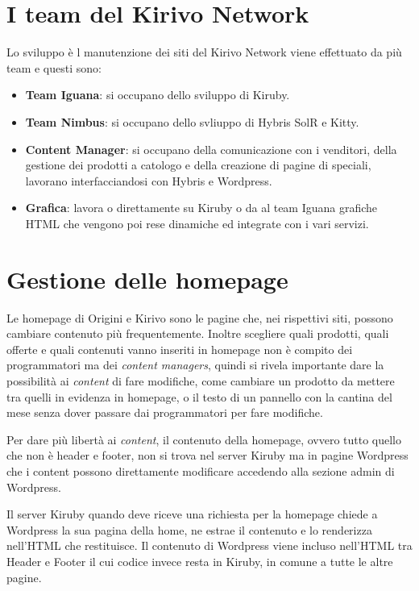 
\section{I team del Kirivo Network}
Lo sviluppo è l manutenzione dei siti del Kirivo Network viene effettuato da più team e questi sono:
\begin{itemize}
\item {\bf Team Iguana}: si occupano dello sviluppo di Kiruby.
\item {\bf Team Nimbus}: si occupano dello svliuppo di Hybris SolR e Kitty.
\item {\bf Content Manager}: si occupano della comunicazione con i venditori, della gestione dei prodotti a catologo
 e della creazione di pagine di speciali, lavorano interfacciandosi con Hybris e Wordpress.
\item {\bf Grafica}: lavora o direttamente su Kiruby o da al team Iguana grafiche HTML che vengono poi rese dinamiche 
ed integrate con i vari servizi.
\end{itemize}

\section{Gestione delle homepage} 	

Le homepage di Origini e Kirivo sono le pagine che, nei rispettivi siti, possono cambiare contenuto più 
frequentemente. Inoltre scegliere quali prodotti, quali offerte e quali contenuti 
vanno inseriti in homepage non è compito dei programmatori ma dei \emph{content managers},
quindi si rivela importante dare la possibilità ai \emph{content} di fare modifiche, come cambiare un prodotto da
mettere tra quelli in evidenza in homepage, o il testo di un pannello con la cantina del mese senza dover passare 
dai programmatori per fare modifiche.

Per dare più libertà ai \emph{content}, il contenuto della homepage, ovvero tutto quello che non è
header e footer, non si trova nel server Kiruby ma in pagine Wordpress che i content possono direttamente 
modificare accedendo alla sezione admin di Wordpress.


Il server Kiruby quando deve riceve una richiesta per la homepage chiede a Wordpress la sua pagina della home, ne estrae
il contenuto e lo renderizza nell'HTML che restituisce. Il contenuto di Wordpress viene incluso nell'HTML tra Header e Footer il cui codice invece resta in Kiruby, in comune a tutte le altre pagine.


